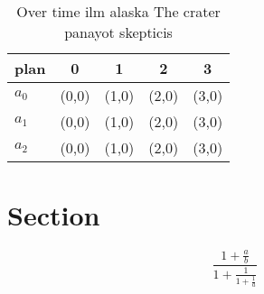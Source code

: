 \documentclass[a4paper]{article}
\begin{document}
\begin{table}
\begin{adjustbox}{width=0.6\columnwidth}
\begin{tabular}{|l|l|l|l|l|}
\hline
\textbf{plan} & \multicolumn{1}{c|}{\textbf{0}} & \multicolumn{1}{c|}{\textbf{1}} & \multicolumn{1}{c|}{\textbf{2}} & \multicolumn{1}{c|}{\textbf{3}} \\ \hline
\textbf{$a_0$}  & (0,0) & (1,0) & (2,0) & (3,0) \\ \hline
\textbf{$a_1$}  & (0,0) & (1,0) & (2,0) & (3,0) \\ \hline
\textbf{$a_2$}  & (0,0) & (1,0) & (2,0) & (3,0) \\ \hline
\end{tabular}
\end{adjustbox}
\caption{Over time ilm alaska The crater panayot skepticis
}
\end{table}

\section{Section}

\[ \frac{1+\frac{a}{b}}{1+\frac{1}{1+\frac{1}{a}}} \]
\end{document}
